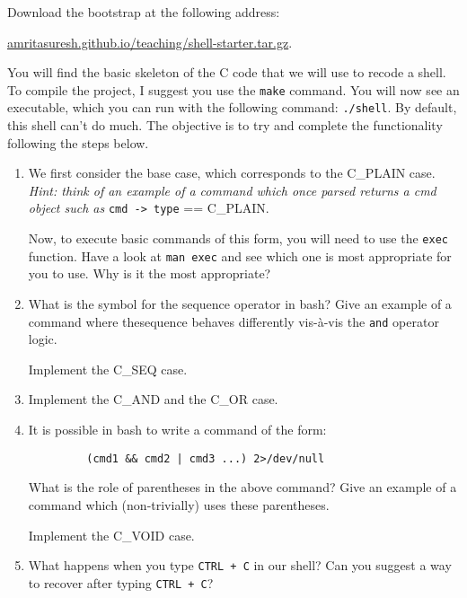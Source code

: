\documentclass[11pt]{article}
\begin{document}
Download the bootstrap at the following address:

 \url{amritasuresh.github.io/teaching/shell-starter.tar.gz}. 
 \bigskip
 
 You will find the basic skeleton of the C code that we will use to recode a shell. To compile the project, I suggest you use the \texttt{make} command. You will now see an executable, which you can run with the following command: \texttt{./shell}. By default, this shell can't do much. The objective is to try and complete the functionality following the steps below. 
 \bigskip
 
 
 \begin{enumerate}
 	\item We first consider the base case, which corresponds to the C\_PLAIN case. \textit{Hint: think of an example of a command which once parsed returns a cmd object such as} \texttt{cmd -> type} == C\_PLAIN.
 	
 	
 	Now, to execute basic commands of this form, you will need to use the \texttt{exec} function. Have a look at \texttt{man exec} and see which one is most appropriate for you to use. Why is it the most appropriate?
 	
 	\bigskip
 	
 	\item What is the symbol for the sequence operator in bash? Give an example of a command where thesequence behaves differently vis-à-vis the \texttt{and} operator logic. 
 	
 	Implement the C\_SEQ case.
 	
 	\bigskip
 	
 	\item Implement the C\_AND and the C\_OR case.
 	
 	\bigskip
 	
 	\item It is possible in bash to write a command of the form:
 	\begin{verbatim}
 		 (cmd1 && cmd2 | cmd3 ...) 2>/dev/null
 	\end{verbatim}
 What is the role of parentheses in the above command? Give an example of a command which (non-trivially) uses these parentheses. 
 
 Implement the C\_VOID case.
 
 \bigskip
 
 \item What happens when you type \texttt{CTRL + C} in our shell? Can you suggest a way to recover after typing \texttt{CTRL + C}?
 

\end{enumerate}
\end{document}
